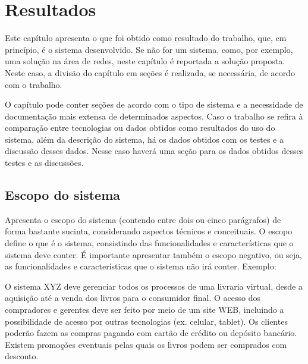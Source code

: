 \chapter{Resultados}\label{cap:resultados}

Este capítulo apresenta o que foi obtido como resultado do trabalho, que, em princípio, é o sistema desenvolvido. Se não for um sistema, como, por exemplo, uma solução na área de redes, neste capítulo é reportada a solução proposta. Neste caso, a divisão do capítulo em seções é realizada, se necessária, de acordo com o trabalho.

O capítulo pode conter seções de acordo com o tipo de sistema e a necessidade de documentação mais extensa de determinados aspectos. Caso o trabalho se refira à comparação entre tecnologias ou dados obtidos como resultados do uso do sistema, além da descrição do sistema, há os dados obtidos com os testes e a discussão desses dados. Nesse caso haverá uma seção para os dados obtidos desses testes e as discussões.

\section{Escopo do sistema}\label{sec:escopoSistema}

Apresenta o escopo do sistema (contendo entre dois ou cinco parágrafos) de forma bastante sucinta, considerando aspectos técnicos e conceituais. O escopo define o que é o sistema, consistindo das funcionalidades e características que o sistema deve conter. É importante apresentar também o escopo negativo, ou seja, as funcionalidades e características que o sistema não irá conter.
Exemplo:

O sistema XYZ deve gerenciar todos os processos de uma livraria virtual, desde a aquisição até a venda dos livros para o consumidor final. O acesso dos compradores e gerentes deve ser feito por meio de um site WEB, incluindo a possibilidade de acesso por outras tecnologias (ex. celular, tablet). Os clientes poderão fazem as compras pagando com cartão de crédito ou depósito bancário. Existem promoções eventuais pelas quais os livros podem ser comprados com desconto.

